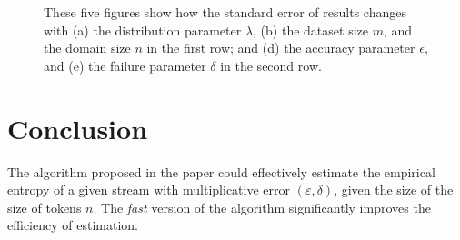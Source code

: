 \documentclass{scrartcl}
\begin{document}
\begin{figure}[t]
\caption{These five figures show how the standard error of results changes with (a) the distribution parameter $\lambda$, (b) the dataset size $m$, and the domain size $n$ in the first row; and (d) the accuracy parameter $\epsilon$, and (e) the failure parameter $\delta$ in the second row.}
\label{fig2}
\end{figure}

\section{Conclusion} %
\label{sec:conclusion}
The algorithm proposed in the paper \citep{chakrabarti2010near} could effectively estimate the empirical entropy of a given stream with multiplicative error $(\varepsilon,\delta)$, given the size of the size of tokens $n$. The \emph{fast} version of the algorithm significantly improves the efficiency of estimation.


\end{document}
